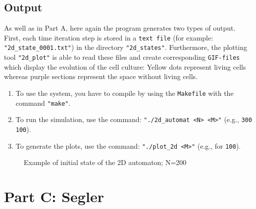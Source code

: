 \documentclass[12pt,a4paper]{article}
\begin{document}
\newpage

\subsection{Output}
As well as in Part A, here again the program generates two types of output.
First, each time iteration step is stored in a \texttt{text file} (for example: \texttt{"2d\_state\_0001.txt"}) in
the directory \texttt{"2d\_states"}.
\newline
Furthermore, the plotting tool \texttt{"2d\_plot"} is able to read these files and create
corresponding \texttt{GIF-files} which display the evolution of the cell culture: Yellow dots
represent living cells whereas purple sections represent the space without living cells.
\newline

\vspace{0.1cm}

\begin{enumerate}[label=\roman*.]
    \item 
    To use the system, you have to compile by using the \texttt{Makefile} with the command \texttt{"make"}.
    \newline
    \vspace{0.1 cm}

    \item 
    To run the simulation, use the command: \texttt{"./2d\_automat <N> <M>"} (e.g., \texttt{300 100}).
    \newline
    \vspace{0.1 cm}

    \item 
    To generate the plots, use the command: \texttt{"./plot\_2d <M>"} (e.g., for \texttt{100}).
\end{enumerate}

\vspace{0.5cm}

\begin{figure}[H]
    \centering
    \caption{\small Example of initial state of the 2D automaton; N=200}
    \label{fig:your_label}
\end{figure}



\newpage


\section{Part C: Segler}
\vspace{1cm}
\end{document}

